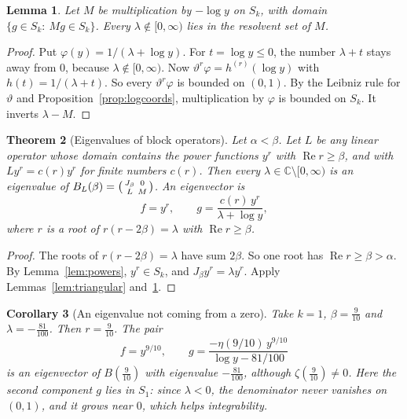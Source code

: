 \documentclass[12pt,letterpaper]{article}
\newtheorem{theorem}{Theorem}[section]
\newtheorem{lemma}[theorem]{Lemma}
\newtheorem{corollary}[theorem]{Corollary}
\theoremstyle{definition}
\theoremstyle{remark}
\numberwithin{equation}{section}
\newcommand{\Ree}{\operatorname{Re}}
\newcommand{\CC}{\mathbb{C}}
\newcommand{\yD}{\vartheta}
\begin{document}
\begin{lemma}\label{lem:resolventM}
Let $M$ be multiplication by $-\log y$ on $S_k$, with domain
$\{g\in S_k:\ Mg\in S_k\}$. Every $\lambda\notin[0,\infty)$ lies in the
resolvent set of $M$.
\end{lemma}

\begin{proof}
Put $\varphi(y)=1/(\lambda+\log y)$. For $t=\log y\le0$, the number
$\lambda+t$ stays away from $0$, because $\lambda\notin[0,\infty)$. Now
$\yD^r\varphi=h^{(r)}(\log y)$ with $h(t)=1/(\lambda+t)$. So every
$\yD^r\varphi$ is bounded on $(0,1)$. By the Leibniz rule for $\yD$ and
Proposition~\ref{prop:logcoords}, multiplication by $\varphi$ is bounded
on $S_k$. It inverts $\lambda-M$.
\end{proof}

\begin{theorem}[Eigenvalues of block operators]\label{thm:manyeigen}
Let $\alpha<\beta$. Let $L$ be any linear operator whose domain contains
the power functions $y^r$ with $\Ree r\ge\beta$, and with
$Ly^r=c(r)y^r$ for finite numbers $c(r)$. Then every
$\lambda\in\CC\setminus[0,\infty)$ is an eigenvalue of
$B_L(\beta)=\begin{psmallmatrix}J_\beta&0\\L&M\end{psmallmatrix}$. An
eigenvector is
\[
f=y^r,\qquad g=\frac{c(r)\,y^r}{\lambda+\log y},
\]
where $r$ is a root of $r(r-2\beta)=\lambda$ with $\Ree r\ge\beta$.
\end{theorem}

\begin{proof}
The roots of $r(r-2\beta)=\lambda$ have sum $2\beta$. So one root has
$\Ree r\ge\beta>\alpha$. By Lemma~\ref{lem:powers}, $y^r\in S_k$, and
$J_\beta y^r=\lambda y^r$. Apply Lemmas~\ref{lem:triangular}
and~\ref{lem:resolventM}.
\end{proof}

\begin{corollary}[An eigenvalue not coming from a zero]\label{cor:thm4false}
Take $k=1$, $\beta=\frac{9}{10}$ and
$\lambda=-\frac{81}{100}$. Then $r=\frac{9}{10}$. The pair
\[
f=y^{9/10},\qquad g=\frac{-\eta(9/10)\,y^{9/10}}{\log y-81/100}
\]
is an eigenvector of $B(\frac{9}{10})$ with eigenvalue
$-\frac{81}{100}$, although $\zeta(\frac{9}{10})\ne0$.  Here the second
component $g$ lies in $S_1$: since $\lambda<0$, the denominator never
vanishes on $(0,1)$, and it grows near $0$, which helps integrability.
\end{corollary}
\end{document}
